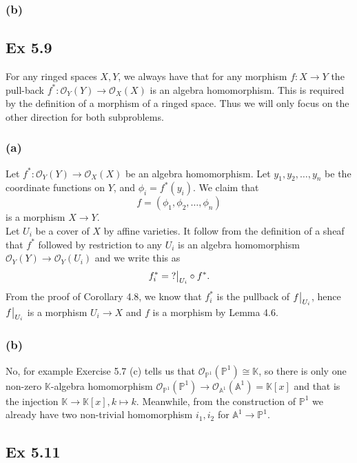 \documentclass{article}
\newcommand\restr[2]{{%
  \left.\kern-\nulldelimiterspace %
  #1 %
  \vphantom{\big|} %
  \right|_{#2} %
  }}
\theoremstyle{definition}
\newcommand{\K}{\mathbb{K}}
\renewcommand{\P}{\mathbb{P}}
\newcommand{\A}{\mathbb{A}}
\renewcommand{\AA}[1]{\A^{#1}}
\newcommand{\PP}[1]{\P^{#1}}
\begin{document}
\subsubsection*{(b)} 


\subsection*{Ex 5.9} 

For any ringed spaces $X, Y$, we always have that for any morphism $f : X \to
Y$ the pull-back $f^* : \mathcal{O}_Y(Y) \to \mathcal{O}_X(X)$ is an algebra
homomorphism. This is required by the definition of a morphism of a ringed
space. Thus we will only focus on the other direction for both subproblems.

\subsubsection*{(a)} 

Let $f^* : \mathcal{O}_Y(Y) \to \mathcal{O}_X(X)$ be an algebra homomorphism.
Let $y_1, y_2, \ldots, y_n$ be the coordinate functions on $Y$, and $\phi_i =
f^*(y_i)$. We claim that
\[
	f = (\phi_1, \phi_2, \ldots, \phi_n)
\] 
is a morphism $X \to Y$. \\ 

Let $U_i$ be a cover of $X$ by affine varieties. It follow from the definition
of a sheaf that $f^*$ followed by restriction to any $U_i$ is an algebra
homomorphism $\mathcal{O}_Y(Y) \to \mathcal{O}_{Y}(U_i)$ and we write this as
\[
	f_i^* = \restr{?}{U_i} \circ f^*.
\] 
From the proof of Corollary 4.8, we know that $f_i^*$ is the pullback of
$\restr{f}{U_i}$, hence $\restr{f}{U_i}$ is a morphism $U_i \to X$ and $f$ is a
morphism by Lemma 4.6.

\subsubsection*{(b)} 

No, for example Exercise 5.7 (c) tells us that $\mathcal{O}_{\PP{1}}(\PP{1})
\cong \K$, so there is only one non-zero $\K$-algebra homomorphism
$\mathcal{O}_{\PP{1}}(\PP{1}) \to \mathcal{O}_{\AA{1}}(\AA{1}) = \K[x]$ and
that is the injection $\K \to \K[x], k \mapsto k$. Meanwhile, from the
construction of $\PP{1}$ we already have two non-trivial homomorphism $i_1,
i_2$ for $\AA{1} \to \PP{1}$.


\subsection*{Ex 5.11} 
\end{document}
